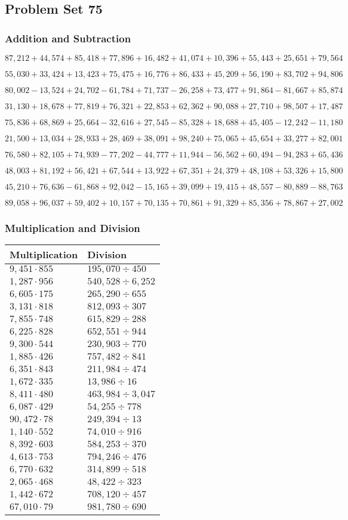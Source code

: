 \hypertarget{problem-set-75}{%
\subsection{Problem Set 75}\label{problem-set-75}}

\hypertarget{addition-and-subtraction-297}{%
\subsubsection{Addition and
Subtraction}\label{addition-and-subtraction-297}}

\(87,212+44,574+85,418+77,896+16,482+41,074+10,396+55,443+25,651+ 79,564\)

\(55,030+33,424+13,423+75,475+16,776+86,433+45,209+56,190+83,702+94,806\)

\(80,002-13,524+24,702-61,784+71,737-26,258+73,477+91,864-81,667+85,874\)

\(31,130+18,678+77,819+76,321+22,853+62,362+90,088+27,710+98,507+17,487\)

\(75,836+68,869+25,664-32,616+27,545-85,328+18,688+45,405-12,242-11,180\)

\(21,500+13,034+28,933+28,469+38,091+98,240+75,065+45,654+33,277+82,001\)

\(76,580+82,105+74,939-77,202-44,777+11,944-56,562+60,494-94,283+65,436\)

\(48,003+81,192+56,421+67,544+13,922+67,351+24,379+48,108+53,326+15,800\)

\(45,210+76,636-61,868+92,042-15,165+39,099+19,415+48,557-80,889-88,763\)

\(89,058+96,037+59,402+10,157+70,135+70,861+91,329+85,356+78,867+27,002\)

\hypertarget{multiplication-and-division-296}{%
\subsubsection{Multiplication and
Division}\label{multiplication-and-division-296}}

\begin{longtable}[]{@{}ll@{}}
\toprule
Multiplication & Division\tabularnewline
\midrule
\endhead
\(9,451\cdot855\) & \(195,070÷450\)\tabularnewline
\(1,287\cdot956\) & \(540,528÷6,252\)\tabularnewline
\(6,605\cdot175\) & \(265,290÷655\)\tabularnewline
\(3,131\cdot818\) & \(812,093÷307\)\tabularnewline
\(7,855\cdot748\) & \(615,829÷288\)\tabularnewline
\(6,225\cdot828\) & \(652,551÷944\)\tabularnewline
\(9,300\cdot544\) & \(230,903÷770\)\tabularnewline
\(1,885\cdot426\) & \(757,482÷841\)\tabularnewline
\(6,351\cdot843\) & \(211,984÷474\)\tabularnewline
\(1,672\cdot335\) & \(13,986÷16\)\tabularnewline
\(8,411\cdot480\) & \(463,984÷3,047\)\tabularnewline
\(6,087\cdot429\) & \(54,255÷778\)\tabularnewline
\(90,472\cdot78\) & \(249,394÷13\)\tabularnewline
\(1,140\cdot552\) & \(74,010÷916\)\tabularnewline
\(8,392\cdot603\) & \(584,253÷370\)\tabularnewline
\(4,613\cdot753\) & \(794,246÷476\)\tabularnewline
\(6,770\cdot632\) & \(314,899÷518\)\tabularnewline
\(2,065\cdot468\) & \(48,422÷323\)\tabularnewline
\(1,442\cdot672\) & \(708,120÷457\)\tabularnewline
\(67,010\cdot79\) & \(981,780÷690\)\tabularnewline
\bottomrule
\end{longtable}

